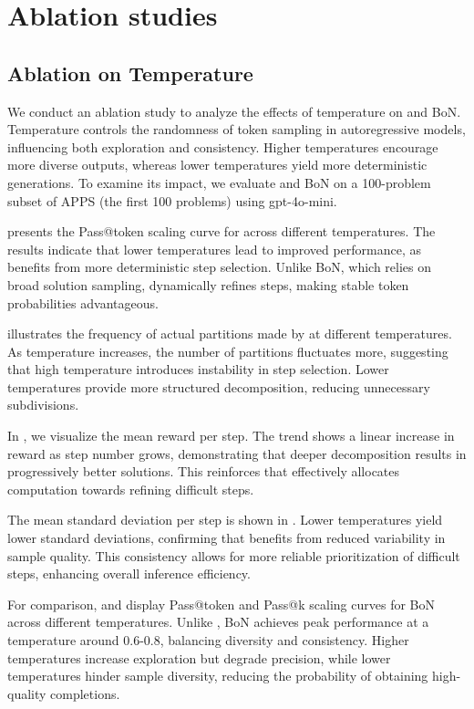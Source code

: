 \section{Ablation studies}

\subsection{Ablation on Temperature}
\label{sec:ab_temp}

We conduct an ablation study to analyze the effects of temperature on \decomp and BoN. Temperature controls the randomness of token sampling in autoregressive models, influencing both exploration and consistency. Higher temperatures encourage more diverse outputs, whereas lower temperatures yield more deterministic generations. To examine its impact, we evaluate \decomp and BoN on a 100-problem subset of APPS (the first 100 problems) using gpt-4o-mini.

 presents the Pass@token scaling curve for \decomp across different temperatures. The results indicate that lower temperatures lead to improved performance, as \decomp benefits from more deterministic step selection. Unlike BoN, which relies on broad solution sampling, \decomp dynamically refines steps, making stable token probabilities advantageous.

 illustrates the frequency of actual partitions made by \decomp at different temperatures. As temperature increases, the number of partitions fluctuates more, suggesting that high temperature introduces instability in step selection. Lower temperatures provide more structured decomposition, reducing unnecessary subdivisions.

In , we visualize the mean reward per step. The trend shows a linear increase in reward as step number grows, demonstrating that deeper decomposition results in progressively better solutions. This reinforces that \decomp effectively allocates computation towards refining difficult steps.

The mean standard deviation per step is shown in . Lower temperatures yield lower standard deviations, confirming that \decomp benefits from reduced variability in sample quality. This consistency allows for more reliable prioritization of difficult steps, enhancing overall inference efficiency.

For comparison,  and  display Pass@token and Pass@k scaling curves for BoN across different temperatures. Unlike \decomp, BoN achieves peak performance at a temperature around 0.6-0.8, balancing diversity and consistency. Higher temperatures increase exploration but degrade precision, while lower temperatures hinder sample diversity, reducing the probability of obtaining high-quality completions.

